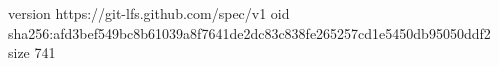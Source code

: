 version https://git-lfs.github.com/spec/v1
oid sha256:afd3bef549bc8b61039a8f7641de2dc83c838fe265257cd1e5450db95050ddf2
size 741
